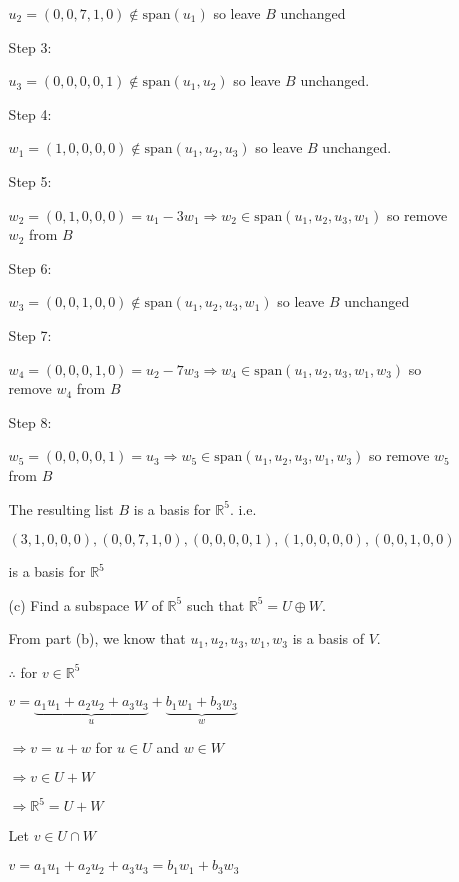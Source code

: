 \documentclass[fleqn]{article}
\begin{document}
\begin{enumerate}[nolistsep]
\begin{enumerate}[nolistsep]
				$u_2 = (0, 0, 7, 1, 0) \not\in \text{span}(u_1)$ so leave $B$ unchanged
				
				Step 3: 
				
				$u_3 = (0, 0, 0, 0, 1) \not\in \text{span}(u_1, u_2)$ so leave $B$ unchanged.
				
				Step 4: 
				
				$w_1 = (1, 0, 0, 0, 0) \not\in \text{span}(u_1, u_2, u_3)$ so leave $B$ unchanged.
				
				Step 5: 
				
				$w_2 = (0, 1, 0, 0, 0) = u_1 - 3w_1 \Rightarrow w_2 \in \text{span}(u_1, u_2, u_3, w_1)$ so remove $w_2$ from $B$
				
				Step 6: 
				
				$w_3 = (0, 0, 1, 0, 0) \not\in \text{span}(u_1, u_2, u_3, w_1)$ so leave $B$ unchanged
				
				Step 7: 
				
				$w_4 = (0, 0, 0, 1, 0) = u_2 - 7w_3 \Rightarrow w_4 \in \text{span}(u_1, u_2, u_3, w_1, w_3)$ so remove $w_4$ from $B$
				
				Step 8: 
				
				$w_5 = (0, 0, 0, 0, 1) = u_3 \Rightarrow w_5 \in \text{span}(u_1, u_2, u_3, w_1, w_3)$ so remove $w_5$ from $B$
				
				The resulting list $B$ is a basis for $\mathbb{R}^5$. i.e. 
				
				$(3, 1, 0, 0, 0), (0, 0, 7, 1, 0), (0, 0, 0, 0, 1), (1, 0, 0, 0, 0), (0, 0, 1, 0, 0)$
				
				is a basis for $\mathbb{R}^5$
					
				\item[(c)] Find a subspace $W$ of $\mathbb{R}^5$ such that $\mathbb{R}^5 = U \oplus W$.
				
				From part (b), we know that $u_1, u_2, u_3, w_1, w_3$ is a basis of $V$.
				
				$\therefore$ for $v \in \mathbb{R}^5$
				
				$v = \underbrace{a_1u_1 + a_2u_2 + a_3u_3}_{u} + \underbrace{b_1w_1 + b_3w_3}_{w}$
				
				$\Rightarrow v = u + w$ for $u \in U$ and $w \in W$
				
				$\Rightarrow v \in U + W$
				
				$\Rightarrow \mathbb{R}^5 = U + W$
				
				Let $v \in U \cap W$
				
				$v = a_1u_1 + a_2u_2 + a_3u_3 = b_1w_1 + b_3w_3$
				

\end{enumerate}
\end{enumerate}
\end{document}
